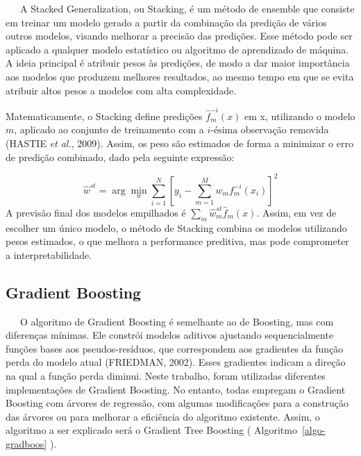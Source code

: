 \documentclass[
  12pt,
  a4paper,
]{scrreprt}
\begin{document}
~~~A Stacked Generalization, ou Stacking, é um método de ensemble que
consiste em treinar um modelo gerado a partir da combinação da predição
de vários outros modelos, visando melhorar a precisão das predições.
Esse método pode ser aplicado a qualquer modelo estatístico ou algoritmo
de aprendizado de máquina. A ideia principal é atribuir pesos às
predições, de modo a dar maior importância aos modelos que produzem
melhores resultados, ao mesmo tempo em que se evita atribuir altos pesos
a modelos com alta complexidade.

\vspace{12pt}

Matematicamente, o Stacking define predições
\(\hat{f}_m^{-i}\left(x\right)\) em x, utilizando o modelo \(m\),
aplicado ao conjunto de treinamento com a \(i\text{-ésima}\) observação
removida (HASTIE \emph{et al.}, 2009). Assim, os peso são estimados de
forma a minimizar o erro de predição combinado, dado pela seguinte
expressão:

\[
\hat{w}^{st} = \arg \min_{w} \sum^{N}_{i = 1} \left[y_i - \sum^{M}_{m = 1} w_m f^{-i}_m\left(x_i\right)\right]^2
\] A previsão final dos modelos empilhados é
\(\sum_{m} \hat{w}_m^{st} \hat{f}_m\left(x\right)\). Assim, em vez de
escolher um único modelo, o método de Stacking combina os modelos
utilizando pesos estimados, o que melhora a performance preditiva, mas
pode comprometer a interpretabilidade.

\subsection{Gradient Boosting}\label{gradient-boosting}

~~~O algoritmo de Gradient Boosting é semelhante ao de Boosting, mas com
diferenças mínimas. Ele constrói modelos aditivos ajustando
sequencialmente funções bases aos pseudos-resíduos, que correspondem aos
gradientes da função perda do modelo atual (FRIEDMAN, 2002). Esses
gradientes indicam a direção na qual a função perda diminui. Neste
trabalho, foram utilizadas diferentes implementações de Gradient
Boosting. No entanto, todas empregam o Gradient Boosting com árvores de
regressão, com algumas modificações para a construção das árvores ou
para melhorar a eficiência do algoritmo existente. Assim, o algoritmo a
ser explicado será o Gradient Tree Boosting
( Algoritmo~\ref{algo-gradboos} ).
\end{document}
